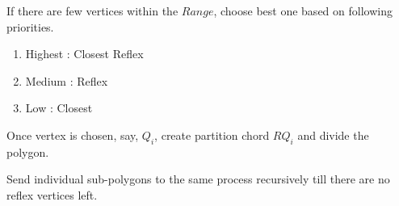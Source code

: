 \begin{list}{}{}

\item 
If there are few vertices within the $Range$, choose best one based on following priorities.
\begin{enumerate}
\item Highest : Closest Reflex 
\item Medium : Reflex 
\item Low : Closest 
\end{enumerate} 


\item 
Once vertex is chosen, say, $Q_i$, create partition chord $RQ_i$ and divide the  polygon.%




\item 
Send individual sub-polygons to the same process recursively till there are no reflex vertices left. 

\end{list}



